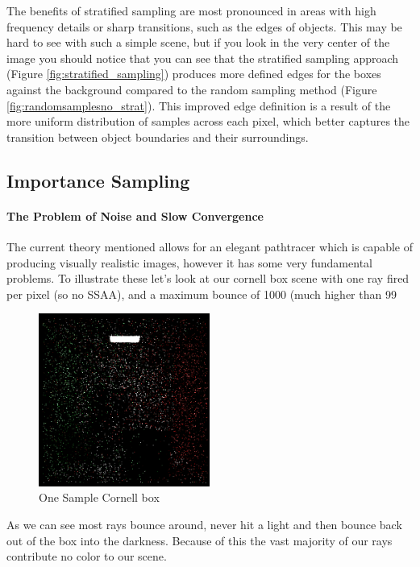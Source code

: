 \documentclass[12pt]{article}
\begin{document}
The benefits of stratified sampling are most pronounced in areas with high frequency details or sharp transitions, such as the edges of objects. This may be hard to see with such a simple scene, but if you look in the very center of the image you should notice that you can see that the stratified sampling approach (Figure \ref{fig:stratified_sampling}) produces more defined edges for the boxes against the background compared to the random sampling method (Figure \ref{fig:randomsamplesno_strat}). This improved edge definition is a result of the more uniform distribution of samples across each pixel, which better captures the transition between object boundaries and their surroundings.

\subsection{Importance Sampling}

\paragraph{The Problem of Noise and Slow Convergence} The current theory mentioned allows for an elegant pathtracer which is capable of producing visually realistic images, however it has some very fundamental problems. To illustrate these let's look at our cornell box scene with one ray fired per pixel (so no SSAA), and a maximum bounce of 1000 (much higher than 99%

\begin{figure}[H]
    \centering
    \includegraphics[width=0.5\textwidth]{images/one_samp/random_sample.png}
    \caption{One Sample Cornell box}
    \label{fig:onesampcornell}
\end{figure}

As we can see most rays bounce around, never hit a light and then bounce back out of the box into the darkness. Because of this the vast majority of our rays contribute no color to our scene.
\end{document}

